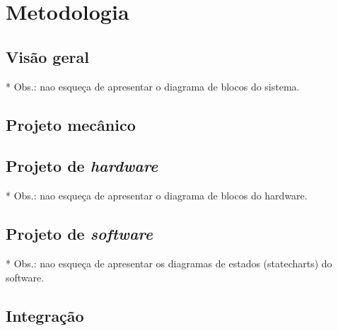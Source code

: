 \chapter{Metodologia}

\section{Visão geral}


* Obs.: nao esqueça de apresentar o diagrama de blocos do sistema. 


\section{Projeto mecânico}


\section{Projeto de \textit{hardware}}


* Obs.: nao esqueça de apresentar o diagrama de blocos do hardware. 


\section{Projeto de \textit{software}}



* Obs.: nao esqueça de apresentar os diagramas de estados (statecharts) do 
software.


\section{Integração}









